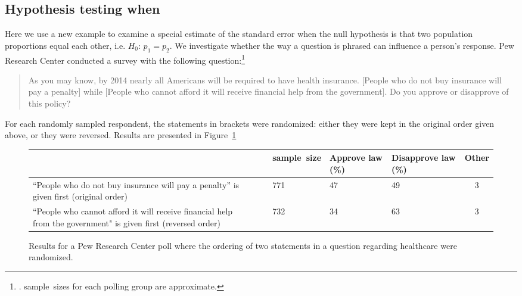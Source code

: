 \D{\newpage}

\subsection[Hypothesis testing when $H_0$: $p_1 = p_2$]{Hypothesis testing when }
\label{pooledHTForProportionsSection}

Here we use a new example to examine a special estimate of the standard error when the null hypothesis is that two population proportions equal each other, i.e. $H_0$: $p_1 = p_2$. We investigate 
whether the way a question is phrased can influence a person's response. Pew Research Center conducted a survey with the following question:\footnote{. sample~sizes for each polling group are approximate.}
\begin{quote}
As you may know, by 2014 nearly all Americans will be required to have health insurance. [People who do not buy insurance will pay a penalty] while [People who cannot afford it will receive financial help from the government]. Do you approve or disapprove of this policy?
\end{quote}
For each randomly sampled respondent, the statements in brackets were randomized: either they were kept in the original order given above, or they were reversed. Results are presented in Figure~\ref{pewPollResultsForRandomizedStatementOrdering}


\begin{figure}[h]
\centering
\begin{tabular}{p{50mm}c p{13mm}p{14mm}p{16.5mm}c}
	&\ & sample~size & Approve law (\%)	& Disapprove law (\%)	& Other \\
\hline
``People who do not buy insurance will pay a penalty'' is given first (original order) \vspace{2.5mm}
	& & 771	& 47	& 49	& 3 \\
``People who cannot afford it will receive financial help from the government" is given first (reversed order) 
	& & 732	& 34	& 63	& 3 \\
\hline
\end{tabular}
\caption{Results for a Pew Research Center poll where the ordering of two statements in a question regarding healthcare were randomized.}
\label{pewPollResultsForRandomizedStatementOrdering}
\end{figure}



